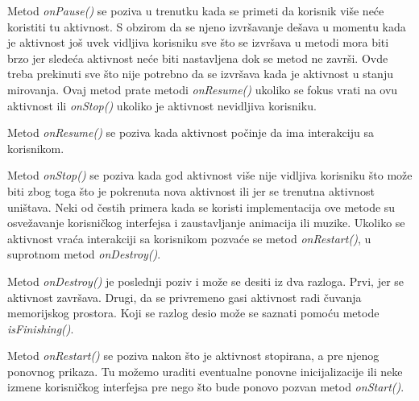 \documentclass[android.tex]{subfiles}
\begin{document}
Metod \textit{onPause()} se poziva u trenutku kada se primeti da korisnik više neće koristiti tu aktivnost. S obzirom da se njeno izvršavanje dešava u momentu kada je aktivnost još uvek vidljiva korisniku sve što se izvršava u metodi mora biti brzo jer sledeća aktivnost neće biti nastavljena dok se metod ne završi. Ovde treba prekinuti sve što nije potrebno da se izvršava kada je aktivnost u stanju mirovanja. Ovaj metod prate metodi \textit{onResume()} ukoliko se fokus vrati na ovu aktivnost ili \textit{onStop() }ukoliko je aktivnost nevidljiva korisniku.

Metod \textit{onResume()} se poziva kada aktivnost počinje da ima interakciju sa korisnikom.

Metod \textit{onStop()} se poziva kada god aktivnost više nije vidljiva korisniku što može biti zbog toga što je pokrenuta nova aktivnost ili jer se trenutna aktivnost uništava. Neki od čestih primera kada se koristi implementacija ove metode su osvežavanje korisničkog interfejsa i zaustavljanje animacija ili muzike. Ukoliko se aktivnost vraća interakciji sa korisnikom pozvaće se metod \textit{onRestart()}, u suprotnom metod \textit{onDestroy()}.

Metod \textit{onDestroy()} je poslednji poziv i može se desiti iz dva razloga. Prvi, jer se aktivnost završava. Drugi, da se privremeno gasi aktivnost radi čuvanja memorijskog prostora. Koji se razlog desio može se saznati pomoću metode \textit{isFinishing()}.

Metod \textit{onRestart() }se poziva nakon što je aktivnost stopirana, a pre njenog ponovnog prikaza. Tu možemo uraditi eventualne ponovne inicijalizacije ili neke izmene korisničkog interfejsa pre nego što bude ponovo pozvan metod \textit{onStart()}.
\end{document}
